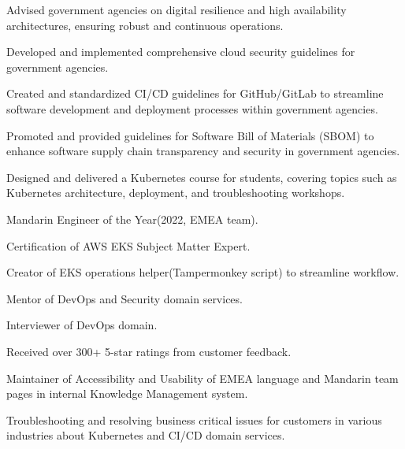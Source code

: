 \documentclass[]{deedy-resume-openfont}
\begin{document}
\begin{minipage}[t]{1\textwidth}
\null\hfill{}
\begin{tightemize}
    \item Advised government agencies on digital resilience and high availability architectures, ensuring robust and continuous operations.
    \item Developed and implemented comprehensive cloud security guidelines for government agencies.
    \item Created and standardized CI/CD guidelines for GitHub/GitLab to streamline software development and deployment processes within government agencies.
    \item Promoted and provided guidelines for Software Bill of Materials (SBOM) to enhance software supply chain transparency and security in government agencies.
\end{tightemize}
\sectionsep

\null\hfill{}
\begin{tightemize}
    \item Designed and delivered a Kubernetes course for students, covering topics such as Kubernetes architecture, deployment, and troubleshooting workshops.
\end{tightemize}
\sectionsep


\null\hfill{}
\begin{tightemize}
    \item Mandarin Engineer of the Year(2022, EMEA team).
    \item Certiﬁcation of AWS EKS Subject Matter Expert.
    \item Creator of EKS operations helper(Tampermonkey script) to streamline workﬂow.
    \item Mentor of DevOps and Security domain services.
    \item Interviewer of DevOps domain.
    \item Received over 300+ 5-star ratings from customer feedback.
    \item Maintainer of Accessibility and Usability of EMEA language and Mandarin team pages in internal Knowledge Management system.
    \item Troubleshooting and resolving business critical issues for customers in various industries about Kubernetes and CI/CD domain services.
\end{tightemize}
\sectionsep


\end{minipage}
\end{document}
